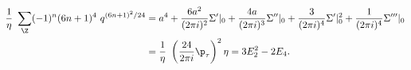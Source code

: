 \begin{equation}
  \begin{split}
    {1\over\eta}~ \sum_\Z (-1)^n (6n+1)^4 ~q^{(6n+1)^2 /24} 
    &= a^4 + {6a^2 \over (2\pi i)^2} \Sigma'|_0 +{4a\over (2\pi
      i)^3} \Sigma''|_0 + {3 \over (2\pi i)^4} {\Sigma'}|_0^2 + {1 \over (2\pi i)^4} \Sigma'''|_0\\ 
    &=  {1\over\eta}~ \left( {24\over 2\pi i} \p_\tau \right)^2
    \eta = 3 E_2^2 - 2 E_4.
  \end{split}
\end{equation}

